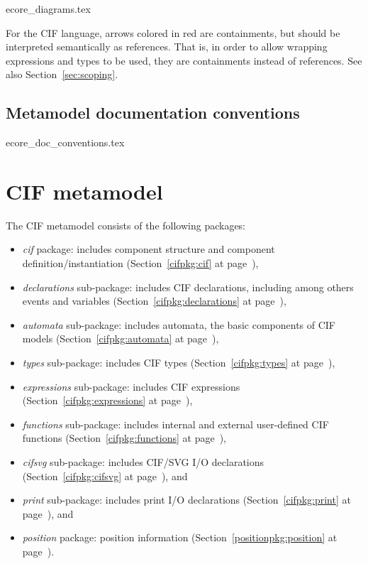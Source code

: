 \documentclass{report}
\begin{document}

       {ecore_diagrams.tex}

For the CIF language, arrows colored in red are containments, but should
be interpreted semantically as references. That is, in order to allow
wrapping expressions and types to be used, they are containments instead of
references. See also Section~\ref{sec:scoping}.


\section{Metamodel documentation conventions}


       {ecore_doc_conventions.tex}


\chapter{CIF metamodel}\label{ch:cif}

The CIF metamodel consists of the following packages:
\begin{itemize}
    \item \emph{cif} package: includes component structure and component
        definition/instantiation (Section~\ref{cifpkg:cif} at
        page~\pageref{cifpkg:cif}),
    \item \emph{declarations} sub-package: includes CIF declarations,
        including among others events and variables
        (Section~\ref{cifpkg:declarations} at
        page~\pageref{cifpkg:declarations}),
    \item \emph{automata} sub-package: includes automata, the basic components
        of CIF models (Section~\ref{cifpkg:automata} at
        page~\pageref{cifpkg:automata}),
    \item \emph{types} sub-package: includes CIF types
        (Section~\ref{cifpkg:types} at page~\pageref{cifpkg:types}),
    \item \emph{expressions} sub-package: includes CIF expressions
        (Section~\ref{cifpkg:expressions} at
        page~\pageref{cifpkg:expressions}),
    \item \emph{functions} sub-package: includes internal and external
        user-defined CIF functions (Section~\ref{cifpkg:functions} at
        page~\pageref{cifpkg:functions}),
    \item \emph{cifsvg} sub-package: includes CIF/SVG I/O declarations
        (Section~\ref{cifpkg:cifsvg} at page~\pageref{cifpkg:cifsvg}),
        and
    \item \emph{print} sub-package: includes print I/O declarations
        (Section~\ref{cifpkg:print} at page~\pageref{cifpkg:print}),
        and
    \item \emph{position} package: position information
        (Section~\ref{positionpkg:position} at
        page~\pageref{positionpkg:position}).
\end{itemize}
\end{document}

